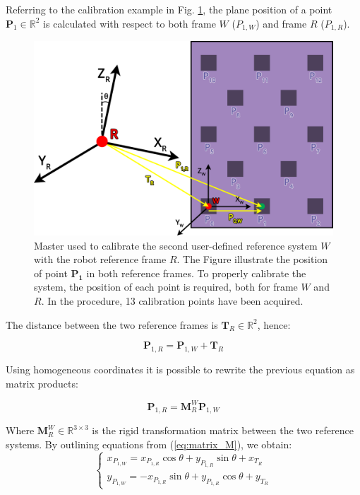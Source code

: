 \documentclass[a4paper, 10 pt, conference]{ieeeconf}      %
\begin{document}
Referring to the calibration example in Fig. \ref{fig:master_robot}, the plane position of a point $\mathbf{P}_1\in\mathbb{R}^2$ is calculated with respect to both frame $W$ ($P_{1,W}$) and frame $R$ ($P_{1,R}$).

\begin{figure}[h]
	\centering
	\includegraphics[width=1\columnwidth]{figures/calibration}
	\caption{Master used to calibrate the second user-defined reference system $W$ with the robot reference frame $R$. The Figure illustrate the position of  point $\mathbf{P_1}$ in both reference frames. To properly calibrate the system, the position of each point is required, both for frame $W$ and $R$. In the procedure, 13 calibration points have been acquired.}
	\label{fig:master_robot}
\end{figure}

The distance between the two reference frames is $\mathbf{T}_R\in\mathbb{R}^2$, hence:

\begin{equation}
\mathbf{P}_{1,R} = \mathbf{P}_{1,W} + \mathbf{T}_R
\end{equation}

Using homogeneous coordinates it is possible to rewrite the previous equation as matrix products:

\begin{equation}\label{eq:matrix_M}
\mathbf{P}_{1,R} = \mathbf{M}^W_{R}\mathbf{P}_{1,W}
\end{equation}

Where $\mathbf{M}^W_{R}\in\mathbb{R}^{3\times3}$ is the rigid transformation matrix between the two reference systems. By outlining equations from (\ref{eq:matrix_M}), we obtain:
\begin{equation}\label{eq:linear_sys1}
\begin{cases}
x_{P_{1,W}}=x_{P_{1,R}}\cos\theta+y_{P_{1,R}}\sin\theta+x_{T_R}\\
y_{P_{1,W}}=-x_{P_{1,R}}\sin\theta+y_{P_{1,R}}\cos\theta+y_{T_R}
\end{cases}
\end{equation}
\end{document}
